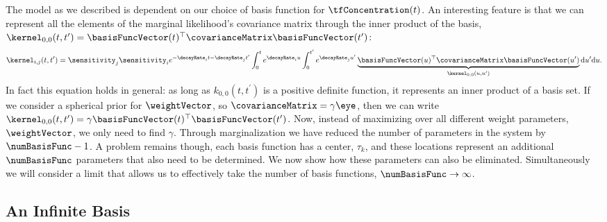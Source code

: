 \documentclass{article}
\begin{document}
The model as we described is dependent on our choice of basis function
for $\tfConcentration(t)$. An interesting feature is that we can
represent all the elements of the marginal likelihood's covariance matrix through
the inner product of the basis, $\kernel_{0,0}(t,
t^\prime)=\basisFuncVector(t)^\top\covarianceMatrix\basisFuncVector(t^\prime)$:
\begin{equation}
  \label{eq:convolution}
\kernel_{i,j}(t,t^\prime) = \sensitivity_j\sensitivity_i e^{-\decayRate_{i}t-\decayRate_{j}t^\prime}\int_0^t
e^{\decayRate_{i}u} \int_0^{t^\prime} e^{\decayRate_{j}u^\prime}\underbrace{\basisFuncVector(u)^\top \covarianceMatrix \basisFuncVector(u^\prime)}_{\kernel_{0,0}(u, u^\prime)}\mathrm{d}u^\prime \mathrm{d}u.
\end{equation}
In fact this equation holds in general: as long as $k_{0,0}(t,
t^\prime)$ is a positive definite function, it represents an inner
product of a basis set. If we consider a spherical prior for
$\weightVector$, so $\covarianceMatrix=\gamma\eye$, then we can write
$\kernel_{0,0}(t,t^\prime) = \gamma
\basisFuncVector(t)^\top\basisFuncVector(t^\prime)$. Now, instead of maximizing
over all different weight parameters, $\weightVector$, we only need to
find $\gamma$. Through marginalization we have reduced the number of
parameters in the system by $\numBasisFunc-1$. A problem remains
though, each basis function has a center, $\tau_k$, and these
locations represent an additional $\numBasisFunc$ parameters that also
need to be determined. We now show how these parameters can also be
eliminated. Simultaneously we will consider a limit that allows us to
effectively take the number of basis functions, $\numBasisFunc\rightarrow\infty$.

\subsection{An Infinite Basis}
\end{document}
